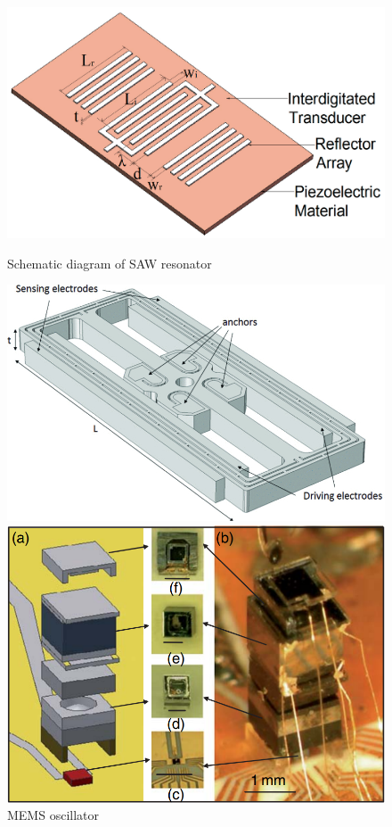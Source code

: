 \begin{figure}[H]
    \begin{minipage}[b]{0.30\textwidth}
        \centering
        \includegraphics[width=\textwidth]{img/SAW_oscillator}
        \caption{Schematic diagram of SAW resonator \cite{mi10060349}}
    \end{minipage}
    \hfill
    \begin{minipage}[b]{0.30\textwidth}
        \centering
        \includegraphics[width=\textwidth]{img/MEMS_resonators}
        \caption{MEMS oscillator \cite{KNAPPE2008571}}
    \end{minipage}
    \hfill
    \begin{minipage}[b]{0.30\textwidth}
        \centering
        \includegraphics[width=\textwidth]{img/atomic_clock_chip_scale}

\end{minipage}
\end{figure}
